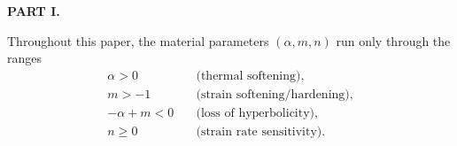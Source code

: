 \documentclass[a4paper,11pt]{article}
\def\blue{\color{blue}}
\theoremstyle{remark}
\begin{document}
{\blue

\begin{center}
  \textbf{PART I.}
\end{center}


Throughout this paper, the material parameters $(\alpha,m,n)$ run only through the ranges
\begin{equation}
 \begin{aligned}
  \alpha>0\quad&\text{(thermal softening)},\\
  m>-1 \quad&\text{(strain softening/hardening)}, \\%
  -\alpha+m<0 \quad&\text{(loss of hyperbolicity)},\\%
  n\ge0 \quad&\text{(strain rate sensitivity)}. %
\end{aligned}\label{eq:paramrange}
\end{equation}

}
\end{document}
